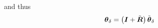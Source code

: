 \documentclass[10pt,dvips,fleqn]{report}
\newcommand{\T}[1]{\boldsymbol{#1}}
\begin{document}
and thus
\begin{equation}
	\T{\theta}_{\delta} = \plbr{\T{I} + \tilde{\T{R}}} \tilde{\T{\theta}}_{\delta}
\end{equation}
\begin{comment}
\begin{align}
	\tilde{\T{\theta}}_{\delta}
	&= \frac{1}{2} \T{\theta}_{\delta} \\
	&= \frac{1}{2} \T{R}_{1h}^T \plbr{\T{\theta}_{2\delta} - \T{\theta}_{1\delta}} \\
	&\cong \frac{1}{2} \T{R}_{1h}^T \plbr{\delta\T{g}_2 - \delta\T{g}_1}
\end{align}
while the perturbation of $\hat{\T{R}}$ yields
\begin{align}
	\delta\hat{\T{R}}
	&= \delta\T{R}_{1h} \tilde{\T{R}} + \T{R}_{1h} \delta\tilde{\T{R}} \\
	&= \T{\theta}_{1\delta} \times \hat{\T{R}}
		+ \frac{1}{2}\plbr{\T{\theta}_{2\delta} - \T{\theta}_{1\delta}} \times \hat{\T{R}} \\
	&= \frac{1}{2}\plbr{\T{\theta}_{2\delta} + \T{\theta}_{1\delta}} \times \hat{\T{R}}
\end{align}
\begin{eqnarray*}
	\tilde{\T{\theta}}_{\delta} & = & \frac{1}{2}\T{\Gamma}\plbr{\tilde{\T{\theta}}}
		\T{\Gamma}\plbr{\T{\theta}}^{-1} \T{R}_{1h}^T\plbr{\T{\theta}_{2\delta} - \T{\theta}_{1\delta}} \\
	& \cong & \frac{1}{2}\T{\Gamma}\plbr{\tilde{\T{\theta}}}
		\T{\Gamma}\plbr{\T{\theta}}^{-1} \T{R}_{1h}^T\plbr{\delta\T{g}_2 - \delta\T{g}_1}
\end{eqnarray*}
The perturbation of $\dot{\tilde{\T{R}}}$ is
\begin{eqnarray*}
	\delta\dot{\tilde{\T{R}}}
	& = & \frac{1}{2}\plbr{\delta\T{\omega}_2 - \delta\T{\omega}_1}\times\tilde{\T{R}}
	+ \frac{1}{2}\plbr{\T{\omega}_2 - \T{\omega}_1}\times\delta\tilde{\T{R}} \\
	& \cong & \frac{1}{2}\plbr{
		\delta\dot{\T{g}}_2 - \T{\omega}_2\times\delta\T{g}_2
		- \delta\dot{\T{g}}_1 + \T{\omega}_1\times\delta\T{g}_1
	}\times\tilde{\T{R}}
	+ \frac{1}{2}\plbr{\T{\omega}_2 - \T{\omega}_1}\times\delta\tilde{\T{R}}
\end{eqnarray*}
The perturbation of $\dot{\hat{\T{R}}}$ is
\begin{eqnarray*}
	\delta\dot{\hat{\T{R}}}
	& = & \frac{1}{2}\plbr{\delta\T{\omega}_2 + \delta\T{\omega}_1}\times\hat{\T{R}}
	+ \frac{1}{2}\plbr{\T{\omega}_2 + \T{\omega}_1}\times\delta\hat{\T{R}} \\

\end{comment}
\end{document}
